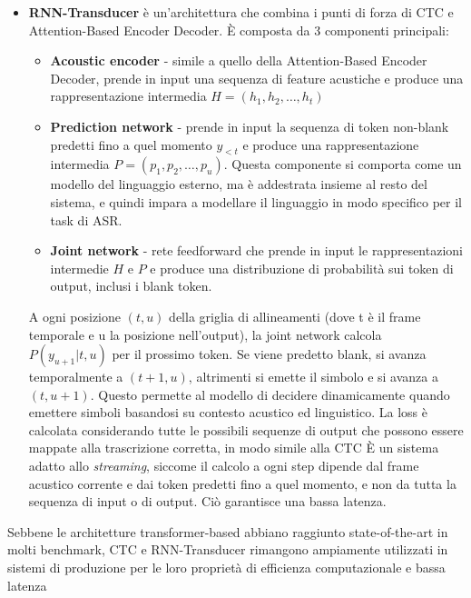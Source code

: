 \documentclass[12pt, a4paper]{article}
\begin{document}
\begin{itemize}
    Lo \textbf{Svantaggio} è che la natura autoregressiva del decoder rende il processo di inferenza sequenziale, e quindi non parallelizzabile, con un conseguente aumento dei tempi di inferenza.
  \item \textbf{RNN-Transducer} è un'architettura che combina i punti di forza di CTC e Attention-Based Encoder Decoder. È composta da 3 componenti principali:
    \begin{itemize}
      \item \textbf{Acoustic encoder} - simile a quello della Attention-Based Encoder Decoder, prende in input una sequenza di feature acustiche e produce una rappresentazione intermedia $H=(h_1, h_2, \dots, h_t)$
      \item \textbf{Prediction network} - prende in input la sequenza di token non-blank predetti fino a quel momento $y_{<t}$ e produce una rappresentazione intermedia $P=(p_1, p_2, \dots, p_u)$. Questa componente si comporta come un modello del linguaggio esterno, ma è addestrata insieme al resto del sistema, e quindi impara a modellare il linguaggio in modo specifico per il task di ASR.
      \item \textbf{Joint network} - rete feedforward che prende in input le rappresentazioni intermedie $H$ e $P$ e produce una distribuzione di probabilità sui token di output, inclusi i blank token.
    \end{itemize}
    A ogni posizione $(t, u)$ della griglia di allineamenti (dove t è il frame temporale e u la posizione nell'output), la joint network
    calcola $P(y_{u+1}|t,u)$ per il prossimo token. Se viene predetto blank, si avanza temporalmente a $(t+1,u)$, altrimenti si emette il
    simbolo e si avanza a $(t,u+1)$. Questo permette al modello di decidere dinamicamente quando emettere simboli basandosi su contesto
    acustico ed linguistico. La loss è calcolata considerando tutte le possibili sequenze di output che possono essere mappate alla
    trascrizione corretta, in modo simile alla CTC
    È un sistema adatto allo \emph{streaming}, siccome il calcolo a ogni step dipende dal frame acustico corrente e dai token predetti fino a quel momento, e non da tutta la sequenza di input o di output. Ciò garantisce una bassa latenza.
\end{itemize}
\vspace{0.5em}

Sebbene le architetture transformer-based abbiano raggiunto state-of-the-art in molti benchmark, CTC e RNN-Transducer
rimangono ampiamente utilizzati in sistemi di produzione per le loro proprietà di efficienza computazionale e bassa latenza
\end{document}
